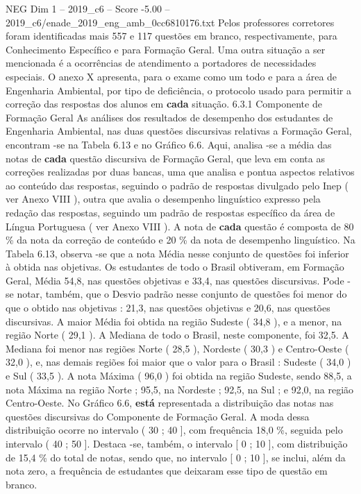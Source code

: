 \begin{textsample}{NEG Dim 1 – 2019\_c6 – Score -5.00 – 2019\_c6/enade\_2019\_eng\_amb\_0cc6810176.txt}
Pelos professores corretores foram identificadas mais 557 e 117 questões em branco, respectivamente, para Conhecimento Específico e para Formação Geral.
Uma outra situação a ser mencionada é a ocorrências de atendimento a portadores de necessidades especiais.
O anexo X apresenta, para o exame como um todo e para a área de Engenharia Ambiental, por tipo de deficiência, o protocolo usado para permitir a correção das respostas dos alunos em \textbf{cada} situação. 6.3.1 Componente de Formação Geral As análises dos resultados de desempenho dos estudantes de Engenharia Ambiental, nas duas questões discursivas relativas a Formação Geral, encontram -se na Tabela 6.13 e no Gráfico 6.6.
Aqui, analisa -se a média das notas de \textbf{cada} questão discursiva de Formação Geral, que leva em conta as correções realizadas por duas bancas, uma que analisa e pontua aspectos relativos ao conteúdo das respostas, seguindo o padrão de respostas divulgado pelo Inep ( ver Anexo VIII ), outra que avalia o desempenho linguístico expresso pela redação das respostas, seguindo um padrão de respostas específico da área de Língua Portuguesa ( ver Anexo VIII ).
A nota de \textbf{cada} questão é composta de 80 \% da nota da correção de conteúdo e 20 \% da nota de desempenho linguístico.
Na Tabela 6.13, observa -se que a nota Média nesse conjunto de questões foi inferior à obtida nas objetivas.
Os estudantes de todo o Brasil obtiveram, em Formação Geral, Média 54,8, nas questões objetivas e 33,4, nas questões discursivas.
Pode -se notar, também, que o Desvio padrão nesse conjunto de questões foi menor do que o obtido nas objetivas : 21,3, nas questões objetivas e 20,6, nas questões discursivas.
A maior Média foi obtida na região Sudeste ( 34,8 ), e a menor, na região Norte ( 29,1 ).
A Mediana de todo o Brasil, neste componente, foi 32,5.
A Mediana foi menor nas regiões Norte ( 28,5 ), Nordeste ( 30,3 ) e Centro-Oeste ( 32,0 ), e, nas demais regiões foi maior que o valor para o Brasil : Sudeste ( 34,0 ) e Sul ( 33,5 ).
A nota Máxima ( 96,0 ) foi obtida na região Sudeste, sendo 88,5, a nota Máxima na região Norte ; 95,5, na Nordeste ; 92,5, na Sul ; e 92,0, na região Centro-Oeste.
No Gráfico 6.6, \textbf{está} representada a distribuição das notas nas questões discursivas do Componente de Formação Geral.
A moda dessa distribuição ocorre no intervalo ( 30 ; 40 ], com frequência 18,0 \%, seguida pelo intervalo ( 40 ; 50 ].
Destaca -se, também, o intervalo [ 0 ; 10 ], com distribuição de 15,4 \% do total de notas, sendo que, no intervalo [ 0 ; 10 ], se inclui, além da nota zero, a frequência de estudantes que deixaram esse tipo de questão em branco.

\end{textsample}
